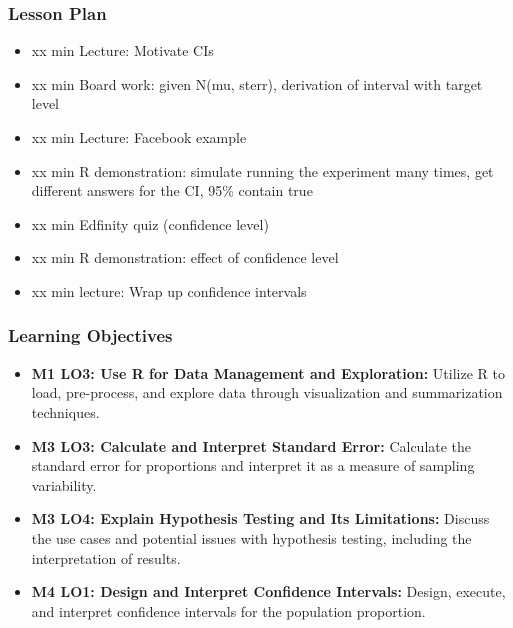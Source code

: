 

\begin{frame}
\frametitle{Lesson Plan}
\begin{itemize}
    \item xx min Lecture: Motivate CIs
    \item xx min Board work: given N(mu, sterr), derivation of interval with target level
    \item xx min Lecture: Facebook example
    \item xx min R demonstration: simulate running the experiment many times, get different answers for the CI, 95\% contain true
    \item xx min Edfinity quiz (confidence level)
    \item xx min R demonstration: effect of confidence level
    \item xx min lecture: Wrap up confidence intervals
\end{itemize}
\end{frame}
        
\begin{frame}
\frametitle{Learning Objectives}
\begin{itemize}
    \item \textbf{M1 LO3: Use R for Data Management and Exploration:} Utilize R to load, pre-process, and explore data through visualization and summarization techniques.
    \item \textbf{M3 LO3: Calculate and Interpret Standard Error:} Calculate the standard error for proportions and interpret it as a measure of sampling variability. 
    \item \textbf{M3 LO4: Explain Hypothesis Testing and Its Limitations:} Discuss the use cases and potential issues with hypothesis testing, including the interpretation of results. 
    \item \textbf{M4 LO1: Design and Interpret Confidence Intervals:} Design, execute, and interpret confidence intervals for the population proportion. 
\end{itemize}
\end{frame}



